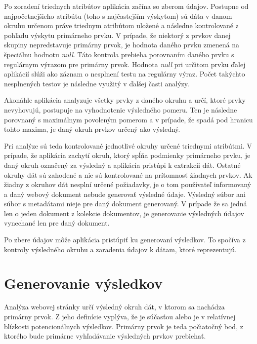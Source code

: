 Po zoradení triednych atribútov aplikácia začína so zberom údajov. Postupne od najpočetnejšieho atribútu (toho s najčastejším výskytom) sú dáta v danom okruhu určenom práve triednym atribútom uložené a následne kontrolované z pohľadu výskytu primárneho prvku. V prípade, že niektorý z prvkov danej skupiny nepredstavuje primárny prvok, je hodnota daného prvku zmenená na špeciálnu hodnotu \textit{null}. Táto kontrola prebieha porovnaním daného prvku s regulárnym výrazom pre primárny prvok. Hodnota \textit{null} pri určitom prvku ďalej aplikácií slúži ako záznam o nesplnení testu na regulárny výraz. Počet takýchto nesplnených testov je následne využitý v ďalšej časti analýzy.

Akonáhle aplikácia analyzuje všetky prvky z daného okruhu a určí, ktoré prvky nevyhovujú, postupuje na vyhodnotenie výsledného pomeru. Ten je následne porovnaný s maximálnym povoleným pomerom a v prípade, že spadá pod hranicu tohto maxima, je daný okruh prvkov určený ako výsledný.

\bigskip

Pri analýze sú teda kontrolované jednotlivé okruhy určené triednymi atribútmi. V prípade, že aplikácia zachytí okruh, ktorý spĺňa podmienky primárneho prvku, je daný okruh označený za výsledný a aplikácia pristúpi k extrakcii dát. Ostatné okruhy dát sú zahodené a nie sú kontrolované na prítomnosť žiadnych prvkov. Ak žiadny z okruhov dát nesplní určené požiadavky, je o tom používateľ informovaný a daný webový dokument nebude generovať výsledné údaje. Výsledný súbor ani súbor s metadátami nieje pre daný dokument generovaný. V prípade že sa jedná len o jeden dokument z kolekcie dokumentov, je generovanie výsledných údajov vynechané len pre daný dokument.

Po zbere údajov môže aplikácia pristúpiť ku generovaní výsledkov. To spočíva z kontroly výsledného okruhu a zaradenia údajov k dátam, ktoré reprezentujú.

\newpage

\section{Generovanie výsledkov}

Analýza webovej stránky určí výsledný okruh dát, v ktorom sa nachádza primárny prvok. Z jeho definície vyplýva, že je súčasťou alebo je v relatívnej blízkosti potencionálnych výsledkov. Primárny prvok je teda počiatočný bod, z ktorého bude primárne vyhľadávanie výsledných prvkov prebiehať. 

